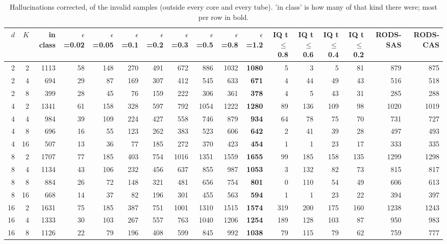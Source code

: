 \begin{table}[t]
\centering
\caption{Hallucinations corrected, of the invalid samples (outside every core and every tube). 'in class' is how many of that kind there were; most per row in bold.}
\label{tab:hall-invalid}
\begin{tabular}{rr r rrrrrrrrrrrrrr}
\toprule
$d$ & $K$ & in class & $\epsilon$=0.02 & $\epsilon$=0.05 & $\epsilon$=0.1 & $\epsilon$=0.2 & $\epsilon$=0.3 & $\epsilon$=0.5 & $\epsilon$=0.8 & $\epsilon$=1.2 & IQ t$\le$0.8 & IQ t$\le$0.6 & IQ t$\le$0.4 & IQ t$\le$0.2 & RODS-SAS & RODS-CAS \\
\midrule
2 & 2 & 1113 & 58 & 148 & 270 & 491 & 672 & 886 & 1032 & \textbf{1080} & 5 & 3 & 5 & 81 & 879 & 875 \\
2 & 4 & 694 & 29 & 87 & 169 & 307 & 412 & 545 & 633 & \textbf{671} & 4 & 44 & 49 & 43 & 516 & 518 \\
2 & 8 & 399 & 28 & 45 & 76 & 159 & 222 & 306 & 361 & \textbf{378} & 4 & 5 & 43 & 31 & 285 & 288 \\
\midrule
4 & 2 & 1341 & 61 & 158 & 328 & 597 & 792 & 1054 & 1222 & \textbf{1280} & 89 & 136 & 109 & 98 & 1020 & 1019 \\
4 & 4 & 984 & 39 & 109 & 224 & 427 & 558 & 746 & 879 & \textbf{934} & 64 & 78 & 75 & 70 & 731 & 727 \\
4 & 8 & 696 & 16 & 55 & 123 & 262 & 383 & 523 & 606 & \textbf{642} & 2 & 41 & 39 & 28 & 497 & 493 \\
4 & 16 & 507 & 13 & 36 & 77 & 185 & 272 & 370 & 423 & \textbf{454} & 1 & 1 & 23 & 17 & 333 & 335 \\
\midrule
8 & 2 & 1707 & 77 & 185 & 403 & 754 & 1016 & 1351 & 1559 & \textbf{1655} & 99 & 185 & 158 & 135 & 1299 & 1298 \\
8 & 4 & 1134 & 43 & 106 & 232 & 456 & 637 & 855 & 987 & \textbf{1053} & 3 & 132 & 82 & 73 & 815 & 817 \\
8 & 8 & 884 & 26 & 72 & 148 & 321 & 481 & 656 & 754 & \textbf{801} & 0 & 110 & 54 & 49 & 606 & 613 \\
8 & 16 & 668 & 14 & 37 & 82 & 196 & 301 & 455 & 563 & \textbf{594} & 1 & 1 & 23 & 22 & 394 & 397 \\
\midrule
16 & 2 & 1631 & 75 & 185 & 387 & 751 & 1001 & 1310 & 1515 & \textbf{1574} & 319 & 200 & 175 & 160 & 1238 & 1243 \\
16 & 4 & 1333 & 30 & 103 & 267 & 557 & 763 & 1040 & 1206 & \textbf{1254} & 189 & 128 & 103 & 87 & 950 & 983 \\
16 & 8 & 1126 & 22 & 79 & 196 & 408 & 599 & 845 & 992 & \textbf{1038} & 79 & 115 & 79 & 62 & 759 & 777 \\

\end{tabular}
\end{table}
